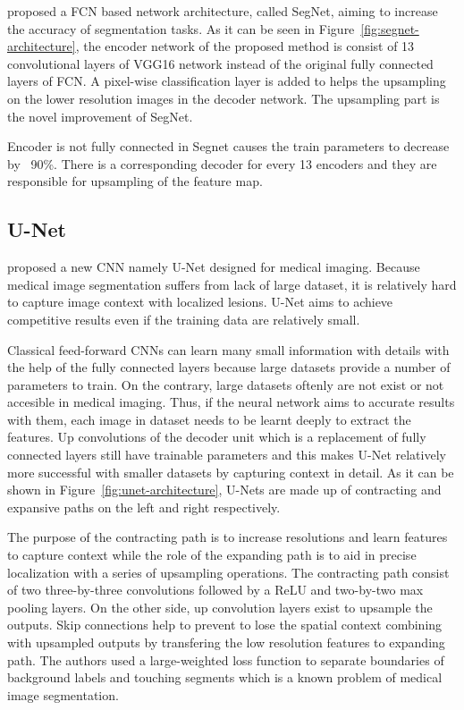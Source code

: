         \citet{badrinarayanan2017segnet} proposed a FCN based network architecture, called SegNet, aiming to increase the accuracy of segmentation tasks.
        As it can be seen in Figure~\ref{fig:segnet-architecture}, the encoder network of the proposed method is consist of 13 convolutional layers of VGG16 network instead of the original fully connected layers of FCN.
        A pixel-wise classification layer is added to helps the upsampling on the lower resolution images in the decoder network.
        The upsampling part is the novel improvement of SegNet.

        

        Encoder is not fully connected in Segnet causes the train parameters to decrease by ~90\%.
        There is a corresponding decoder for every 13 encoders and they are responsible for upsampling of the feature map.

    \subsection{U-Net}\label{sec:unet}

        \citet{ronneberger2015u} proposed a new CNN namely U-Net designed for medical imaging.
        Because medical image segmentation suffers from lack of large dataset, it is relatively hard to capture image context with localized lesions.
        U-Net aims to achieve competitive results even if the training data are relatively small.

        

        Classical feed-forward CNNs can learn many small information with details with the help of the fully connected layers because large datasets provide a number of parameters to train.
        On the contrary, large datasets oftenly are not exist or not accesible in medical imaging.
        Thus, if the neural network aims to accurate results with them, each image in dataset needs to be learnt deeply to extract the features.
        Up convolutions of the decoder unit which is a replacement of fully connected layers still have trainable parameters and this makes U-Net relatively more successful with smaller datasets by capturing context in detail.
        As it can be shown in Figure~\ref{fig:unet-architecture}, U-Nets are made up of contracting and expansive paths on the left and right respectively.

        The purpose of the contracting path is to increase resolutions and learn features  to capture context while the role of the expanding path is to aid in precise localization with a series of upsampling operations.
        The contracting path consist of two three-by-three convolutions followed by a ReLU and two-by-two max pooling layers.
        On the other side, up convolution layers exist to upsample the outputs.
        Skip connections help to prevent to lose the spatial context combining with upsampled outputs by transfering the low resolution features to expanding path.
        The authors used a large-weighted loss function to separate boundaries of background labels and touching segments which is a known problem of medical image segmentation.

